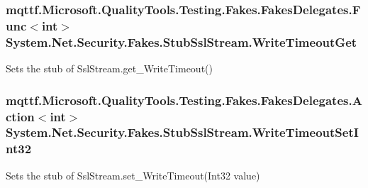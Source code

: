 \hypertarget{class_system_1_1_net_1_1_security_1_1_fakes_1_1_stub_ssl_stream_a4316021b15c3c58fa9702a4bb928ab6e}{
\subsubsection[{Write\-Timeout\-Get}]{\setlength{\rightskip}{0pt plus 5cm}mqttf.\-Microsoft.\-Quality\-Tools.\-Testing.\-Fakes.\-Fakes\-Delegates.\-Func$<$int$>$ System.\-Net.\-Security.\-Fakes.\-Stub\-Ssl\-Stream.\-Write\-Timeout\-Get}}\label{class_system_1_1_net_1_1_security_1_1_fakes_1_1_stub_ssl_stream_a4316021b15c3c58fa9702a4bb928ab6e}


Sets the stub of Ssl\-Stream.\-get\-\_\-\-Write\-Timeout()

\hypertarget{class_system_1_1_net_1_1_security_1_1_fakes_1_1_stub_ssl_stream_af724181f7fb728fb2f9d88e4c3e6e4a3}{
\subsubsection[{Write\-Timeout\-Set\-Int32}]{\setlength{\rightskip}{0pt plus 5cm}mqttf.\-Microsoft.\-Quality\-Tools.\-Testing.\-Fakes.\-Fakes\-Delegates.\-Action$<$int$>$ System.\-Net.\-Security.\-Fakes.\-Stub\-Ssl\-Stream.\-Write\-Timeout\-Set\-Int32}}\label{class_system_1_1_net_1_1_security_1_1_fakes_1_1_stub_ssl_stream_af724181f7fb728fb2f9d88e4c3e6e4a3}


Sets the stub of Ssl\-Stream.\-set\-\_\-\-Write\-Timeout(\-Int32 value)



